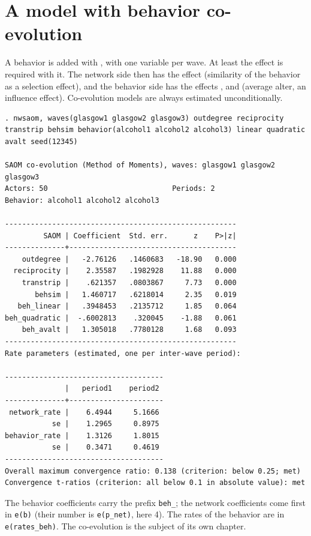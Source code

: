 \section{A model with behavior co-evolution}

A behavior is added with , with one variable per wave. At least the effect  is required with it. The network side then has the effect  (similarity of the behavior as a selection effect), and the behavior side has the effects ,  and  (average alter, an influence effect). Co-evolution models are always estimated unconditionally.
\begin{lstlisting}
. nwsaom, waves(glasgow1 glasgow2 glasgow3) outdegree reciprocity transtrip behsim behavior(alcohol1 alcohol2 alcohol3) linear quadratic avalt seed(12345)

SAOM co-evolution (Method of Moments), waves: glasgow1 glasgow2 glasgow3
Actors: 50                             Periods: 2
Behavior: alcohol1 alcohol2 alcohol3

------------------------------------------------------
         SAOM | Coefficient  Std. err.      z    P>|z|
--------------+---------------------------------------
    outdegree |   -2.76126   .1460683   -18.90   0.000
  reciprocity |    2.35587   .1982928    11.88   0.000
    transtrip |    .621357   .0803867     7.73   0.000
       behsim |   1.460717   .6218014     2.35   0.019
   beh_linear |   .3948453   .2135712     1.85   0.064
beh_quadratic |  -.6002813    .320045    -1.88   0.061
    beh_avalt |   1.305018   .7780128     1.68   0.093
------------------------------------------------------
Rate parameters (estimated, one per inter-wave period):

-------------------------------------
              |   period1    period2
--------------+----------------------
 network_rate |    6.4944     5.1666
           se |    1.2965     0.8975
behavior_rate |    1.3126     1.8015
           se |    0.3471     0.4619
-------------------------------------
Overall maximum convergence ratio: 0.138 (criterion: below 0.25; met)
Convergence t-ratios (criterion: all below 0.1 in absolute value): met
\end{lstlisting}
The behavior coefficients carry the prefix \texttt{beh\_}; the network coefficients come first in \texttt{e(b)} (their number is \texttt{e(p\_net)}, here 4). The rates of the behavior are in \texttt{e(rates\_beh)}. The co-evolution is the subject of its own chapter.

